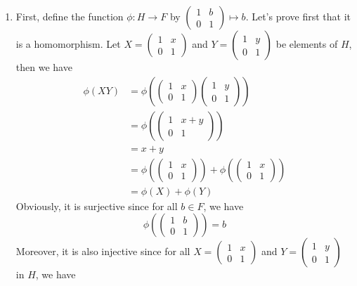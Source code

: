 \begin{solution}
\begin{enumerate}[label = \textbf{(\alph*)}]
        \item First, define the function $\phi : H \to F$ by 
        $\begin{pmatrix} 1 & b \\ 0 & 1 \end{pmatrix} \mapsto b$. Let's prove first that it is a homomorphism. Let $X = \begin{pmatrix} 1 & x \\ 0 & 1 \end{pmatrix}$ and  $Y = \begin{pmatrix} 1 & y \\ 0 & 1 \end{pmatrix}$ be elements of $H$, then we have
        \begin{align*}
            \phi(XY) &= \phi\left(\begin{pmatrix} 1 & x \\ 0 & 1 \end{pmatrix} \begin{pmatrix} 1 & y \\ 0 & 1 \end{pmatrix}\right) \\
            &= \phi\left(\begin{pmatrix} 1 & x+y \\ 0 & 1 \end{pmatrix}\right) \\
            &= x + y \\
            &= \phi\left(\begin{pmatrix} 1 & x \\ 0 & 1 \end{pmatrix}\right) + \phi\left(\begin{pmatrix} 1 & x \\ 0 & 1 \end{pmatrix}\right) \\
            &= \phi(X) + \phi(Y)
        \end{align*}
        Obviously, it is surjective since for all $b \in F$, we have 
        $$\phi\left(\begin{pmatrix} 1 & b \\ 0 & 1 \end{pmatrix}\right) = b$$
        Moreover, it is also injective since for all $X = \begin{pmatrix} 1 & x \\ 0 & 1 \end{pmatrix}$ and $Y = \begin{pmatrix} 1 & y \\ 0 & 1 \end{pmatrix}$ in $H$, we have

\end{enumerate}
\end{solution}
